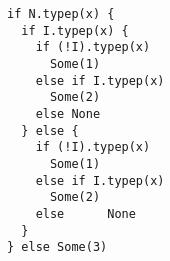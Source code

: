 \begin{lstlisting}[style=reclojureScala]
if N.typep(x) {
  if I.typep(x) {
    if (!I).typep(x)
      Some(1)
    else if I.typep(x)
      Some(2)
    else None
  } else {
    if (!I).typep(x)
      Some(1)
    else if I.typep(x)
      Some(2)
    else      None
  }
} else Some(3)
\end{lstlisting}
